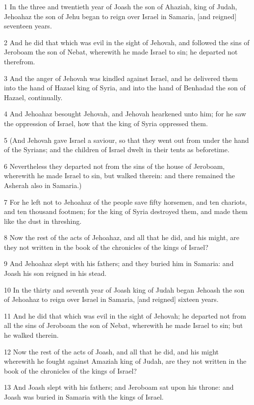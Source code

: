 \par 1 In the three and twentieth year of Joash the son of Ahaziah, king of Judah, Jehoahaz the son of Jehu began to reign over Israel in Samaria, [and reigned] seventeen years.
\par 2 And he did that which was evil in the sight of Jehovah, and followed the sins of Jeroboam the son of Nebat, wherewith he made Israel to sin; he departed not therefrom.
\par 3 And the anger of Jehovah was kindled against Israel, and he delivered them into the hand of Hazael king of Syria, and into the hand of Benhadad the son of Hazael, continually.
\par 4 And Jehoahaz besought Jehovah, and Jehovah hearkened unto him; for he saw the oppression of Israel, how that the king of Syria oppressed them.
\par 5 (And Jehovah gave Israel a saviour, so that they went out from under the hand of the Syrians; and the children of Israel dwelt in their tents as beforetime.
\par 6 Nevertheless they departed not from the sins of the house of Jeroboam, wherewith he made Israel to sin, but walked therein: and there remained the Asherah also in Samaria.)
\par 7 For he left not to Jehoahaz of the people save fifty horsemen, and ten chariots, and ten thousand footmen; for the king of Syria destroyed them, and made them like the dust in threshing.
\par 8 Now the rest of the acts of Jehoahaz, and all that he did, and his might, are they not written in the book of the chronicles of the kings of Israel?
\par 9 And Jehoahaz slept with his fathers; and they buried him in Samaria: and Joash his son reigned in his stead.
\par 10 In the thirty and seventh year of Joash king of Judah began Jehoash the son of Jehoahaz to reign over Israel in Samaria, [and reigned] sixteen years.
\par 11 And he did that which was evil in the sight of Jehovah; he departed not from all the sins of Jeroboam the son of Nebat, wherewith he made Israel to sin; but he walked therein.
\par 12 Now the rest of the acts of Joash, and all that he did, and his might wherewith he fought against Amaziah king of Judah, are they not written in the book of the chronicles of the kings of Israel?
\par 13 And Joash slept with his fathers; and Jeroboam sat upon his throne: and Joash was buried in Samaria with the kings of Israel.
